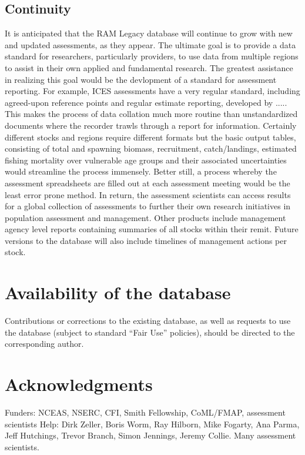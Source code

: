 \documentclass[letterpaper,12pt]{article}
\begin{document}
\subsection{Continuity}
It is anticipated that the RAM Legacy database will continue to grow with new and updated assessments, as they appear. The ultimate goal is to provide a data standard for researchers, particularly providers, to use data from multiple regions to assist in their own applied and fundamental research. The greatest assistance in realizing this goal would be the devlopment of a standard for assessment reporting. For example, ICES assessments have a very regular standard, including agreed-upon reference points and regular estimate reporting, developed by ..... This makes the process of data collation much more routine than unstandardized documents where the recorder trawls through a report for information. Certainly different stocks and regions require different formats but the basic output tables, consisting of total and spawning biomass, recruitment, catch/landings, estimated fishing mortality over vulnerable age groups and their associated uncertainties would streamline the process immensely. Better still, a process whereby the assessment spreadsheets are filled out at each assessment meeting would be the least error prone method. In return, the assessment scientists can access results for a global collection of assessments to further their own research initiatives in population assessment and management. Other products include management agency level reports containing summaries of all stocks within their remit. Future versions to the database will also include timelines of management actions per stock.

\begin{comment}
- Weather forecasting and climatology note don't
use these terms (central repository)
\end{comment}

\newpage

\section*{Availability of the database} Contributions or corrections
to the existing database, as well as requests to use the database
(subject to standard ``Fair Use'' policies), should be directed to the
corresponding author.


\section*{Acknowledgments }
Funders: NCEAS, NSERC, CFI, Smith Fellowship, CoML/FMAP, assessment scientists 
Help: Dirk Zeller, Boris Worm, Ray Hilborn, Mike Fogarty, Ana Parma, Jeff Hutchings, Trevor Branch, Simon Jennings, Jeremy Collie. Many assessment scientists.


\newpage
%
%




\appendix



\end{document}
